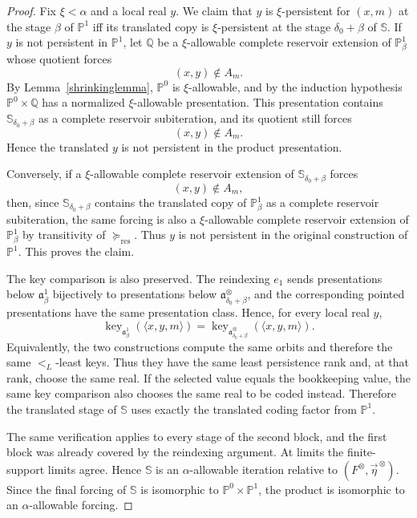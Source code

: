 \documentclass[a4paper,11pt]{article}
\newcommand{\forceP}{\mathbb{P}}
\newcommand{\forceQ}{\mathbb{Q}}
\newcommand{\forceS}{\mathbb{S}}
\newcommand{\key}{\operatorname{key}}
\begin{document}
\begin{proof}
Fix $\xi<\alpha$ and a local real $y$.  We claim that $y$ is
$\xi$-persistent for $(x,m)$ at the stage $\beta$ of $\forceP^1$ iff its
translated copy is $\xi$-persistent at the stage $\delta_0+\beta$ of
$\forceS$.  If $y$ is not persistent in $\forceP^1$, let $\forceQ$ be a
$\xi$-allowable complete reservoir extension of $\forceP^1_\beta$ whose
quotient forces
\[
   (x,y)\notin A_m.
\]
By Lemma~\ref{shrinkinglemma}, $\forceP^0$ is $\xi$-allowable, and by the
induction hypothesis $\forceP^0\times\forceQ$ has a normalized
$\xi$-allowable presentation.  This presentation contains
$\forceS_{\delta_0+\beta}$ as a complete reservoir subiteration, and its
quotient still forces
\[
   (x,y)\notin A_m.
\]
Hence the translated $y$ is not persistent in the product presentation.

Conversely, if a $\xi$-allowable complete reservoir extension of
$\forceS_{\delta_0+\beta}$ forces
\[
   (x,y)\notin A_m,
\]
then, since $\forceS_{\delta_0+\beta}$ contains the translated copy of
$\forceP^1_\beta$ as a complete reservoir subiteration, the same forcing is
also a $\xi$-allowable complete reservoir extension of $\forceP^1_\beta$ by
transitivity of $\succeq_{\mathrm{res}}$.  Thus $y$ is not persistent in the
original construction of $\forceP^1$.  This proves the claim.

The key comparison is also preserved.  The reindexing $e_1$ sends presentations
below $\mathfrak a^1_\beta$ bijectively to presentations below
$\mathfrak a^\otimes_{\delta_0+\beta}$, and the corresponding pointed
presentations have the same presentation class.  Hence, for every local real
$y$,
\[
   \key_{\mathfrak a^1_\beta}
      (\langle x,y,m\rangle)
   =
   \key_{\mathfrak a^\otimes_{\delta_0+\beta}}
      (\langle x,y,m\rangle).
\]
Equivalently, the two constructions compute the same orbits and therefore the
same $<_L$-least keys.  Thus they have the same least persistence rank and,
at that rank, choose the same real.  If the selected value equals the
bookkeeping value, the same key comparison also chooses the same real to be
coded instead.  Therefore the translated stage of $\forceS$ uses exactly the
translated coding factor from $\forceP^1$.

The same verification applies to every stage of the second block, and the
first block was already covered by the reindexing argument.  At limits the
finite-support limits agree.  Hence $\forceS$ is an $\alpha$-allowable
iteration relative to $(F^\otimes,\vec\eta^{\,\otimes})$.  Since the final
forcing of $\forceS$ is isomorphic to $\forceP^0\times\forceP^1$, the product
is isomorphic to an $\alpha$-allowable forcing.
\end{proof}
\end{document}
